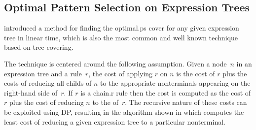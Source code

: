 \subsection{Optimal Pattern Selection on Expression Trees}

\textcite{AhoEtAl:1989} introduced a method for finding the \gls{optimal.ps}
\gls{cover} for any given \gls{expression tree} in linear time, which is also
the most common and well known technique based on \gls{tree covering}.

The technique is centered around the following assumption.
%
Given a \gls{node}~$n$ in an \gls{expression tree} and a \gls{rule}~$r$, the
cost of applying $r$ on $n$ is the cost of $r$ plus the costs of reducing all
\glspl{child} of $n$ to the appropriate \glspl{nonterminal} appearing on the
right-hand side of~$r$.
%
If $r$ is a \gls{chain.r} \gls{rule} then the cost is computed as the cost of
$r$ plus the cost of reducing $n$ to the  of~$r$.
%
The recursive nature of these costs can be exploited using \glsdesc{DP},
resulting in the algorithm shown in  which
computes the least cost of reducing a given \gls{expression tree} to a
particular \gls{nonterminal}.

